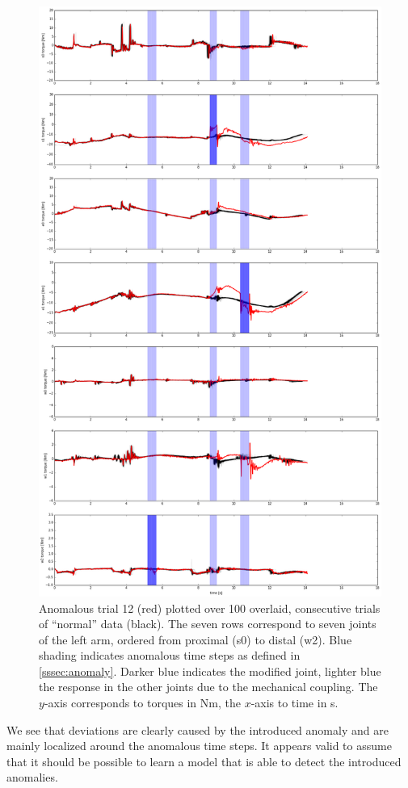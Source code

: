 \documentclass{scrartcl}
\begin{document}
    \begin{figure}
        \centering
        \includegraphics[width=.7\textwidth]{figs/anomaly12.png}
        \caption{Anomalous trial 12 (red) plotted over 100 overlaid, consecutive trials of ``normal'' data (black).
            The seven rows correspond to seven joints of the left arm, ordered from proximal (s0) to distal (w2).
            Blue shading indicates anomalous time steps as defined in \cref{sssec:anomaly}.
            Darker blue indicates the modified joint, lighter blue the response in the other joints due to the mechanical coupling.
            The $y$-axis corresponds to torques in Nm, the $x$-axis to time in s.}
        \label{fig:anomaly12}
    \end{figure}
    We see that deviations are clearly caused by the introduced anomaly and are mainly localized around the anomalous time steps.
    It appears valid to assume that it should be possible to learn a model that is able to detect the introduced anomalies. 
    
\end{document}
